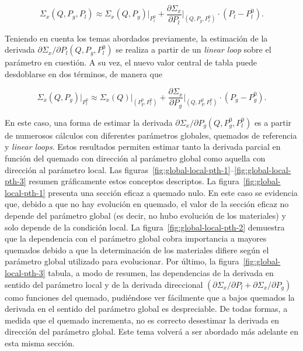 \documentclass[11pt]{article}
\begin{document}
\begin{equation} \label{ec:aprox-general-2}
 \Sigma_x \left( Q, P_g, P_l   \right) \approx 
 \Sigma_x \left( Q, P_g        \right)\bigg|_{P^0_l} +
 \frac{\partial\Sigma_x}{\partial P_l}\bigg|_{\left( Q, P_g, P^0_l \right)} \cdot \left(P_l - P^0_l \right).
\end{equation}

\noindent
Teniendo en cuenta los temas abordados previamente, la estimación de la derivada $\partial\Sigma_x / \partial P_l \left( Q, P_g, P^0_l \right)$ se realiza a partir de un \emph{linear loop} sobre el parámetro en cuestión. A su vez, el nuevo valor central de tabla puede desdoblarse en dos términos, de manera que

\begin{equation} \label{ec:aprox-general-3}
 \Sigma_x \left( Q, P_g \right)\bigg|_{P^0_l} \approx
 \Sigma_x \left( Q \right)\bigg|_{\left( P^0_g, P^0_l \right)} +
 \frac{\partial\Sigma_x}{\partial P_g}\bigg|_{\left( Q, P^0_g, P^0_l \right)} \cdot \left(P_g - P^0_g \right).
\end{equation}

\noindent
En este caso, una forma de estimar la derivada $\partial\Sigma_x / \partial P_g \left( Q, P^0_g, P^0_l \right)$ es a partir de numerosos cálculos con diferentes parámetros globales, quemados de referencia y \emph{linear loops}. Estos resultados permiten estimar tanto la derivada parcial en función del quemado con dirección al parámetro global como aquella con dirección al parámetro local. Las figuras~\ref{fig:global-local-pth-1}--\ref{fig:global-local-pth-3} resumen gráficamente estos conceptos descriptos. La figura~\ref{fig:global-local-pth-1} presenta una sección eficaz a quemado nulo. En este caso se evidencia que, debido a que no hay evolución en quemado, el valor de la sección eficaz no depende del parámetro global (es decir, no hubo evolución de los materiales) y solo depende de la condición local. La figura~\ref{fig:global-local-pth-2} demuestra que la dependencia con el parámetro global cobra importancia a mayores quemados debido a que la determinación de los materiales difiere según el parámetro global utilizado para evolucionar. Por último, la figura~\ref{fig:global-local-pth-3} tabula, a modo de resumen, las dependencias de la derivada en sentido del parámetro local y de la derivada direccional $\left( \partial\Sigma_x / \partial P_l + \partial\Sigma_x / \partial P_g \right)$ como funciones del quemado, pudiéndose ver fácilmente que a bajos quemados la derivada en el sentido del parámetro global es despreciable. De todas formas, a medida que el quemado incrementa, no es correcto desestimar la derivada en dirección del parámetro global. Este tema volverá a ser abordado más adelante en esta misma sección.
\end{document}
